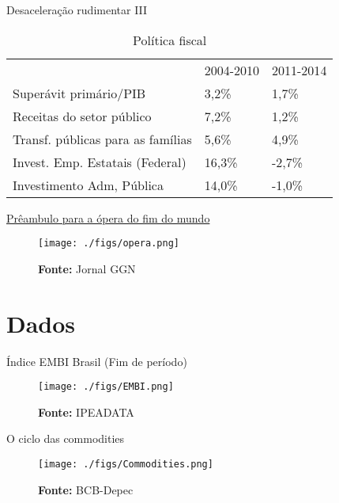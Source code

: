 \documentclass[presentation]{beamer}
\begin{document}
\begin{frame}[label={sec:org1b657b3}]{Desaceleração rudimentar III}
\begin{table}[htbp]
\caption{Política fiscal}
\centering
\begin{tabular}{lll}
\hline
 & 2004-2010 & 2011-2014\\
Superávit primário/PIB & 3,2\% & 1,7\%\\
Receitas do setor público & 7,2\% & 1,2\%\\
Transf. públicas para as famílias & 5,6\% & 4,9\%\\
Invest. Emp. Estatais (Federal) & 16,3\% & -2,7\%\\
Investimento Adm, Pública & 14,0\% & -1,0\%\\
\hline
\end{tabular}
\end{table}
\end{frame}


\begin{frame}[label={sec:org48299b2}]{\href{https://www.causaoperaria.org.br/brasil-o-golpe-a-opera-do-fim-do-mundo-artista-retrata-o-golpe-de-estado-no-pais/}{Prêambulo para a ópera do fim do mundo}}
\begin{figure}[htb]
\centering
\caption{Brasil, O Golpe: A Ópera do fim do mundo} 
\texttt{[image: ./figs/opera.png]}
\caption*{\textbf{Fonte:} Jornal GGN}
\end{figure}
\end{frame}


\section{Dados}
\label{sec:org64934fc}

\begin{frame}[label={sec:org81774a0}]{Índice EMBI Brasil (Fim de período)}
\begin{figure}[htb]
\centering
\caption{Spread Soberano = EMBI+} 
\texttt{[image: ./figs/EMBI.png]}
\label{fig:embi}
\caption*{\textbf{Fonte:} IPEADATA}
\end{figure}
\end{frame}

\begin{frame}[label={sec:org8b8b50b}]{O ciclo das commodities}
\begin{figure}[htb]
\centering
\caption{Índice de Commodities - Brasil\\Média móvel 12 meses} 
\texttt{[image: ./figs/Commodities.png]}
\caption*{\textbf{Fonte:} BCB-Depec}
\end{figure}
\end{frame}
\end{document}
